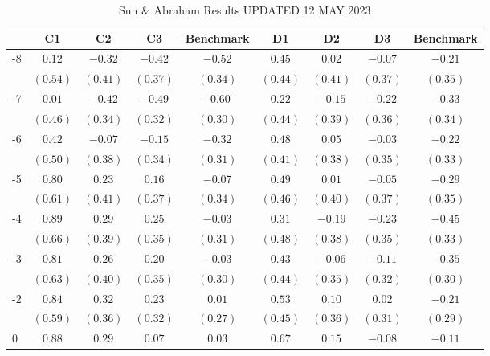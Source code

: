 \documentclass[12pt]{amsart}
\begin{document}
\begin{table}
\begin{center}
\caption{Sun \& Abraham Results UPDATED 12 MAY 2023}
\begin{adjustbox}{width= 0.8\textwidth}
\begin{tabular}{l c c c c | c c c c}
\hline
 & C1 & C2 & C3 & Benchmark & D1 & D2 & D3 & Benchmark \\
\hline
-8 & $0.12$         & $-0.32$  & $-0.42$  & $-0.52$         & $0.45$         & $0.02$   & $-0.07$  & $-0.21$  \\
   & $(0.54)$       & $(0.41)$ & $(0.37)$ & $(0.34)$        & $(0.44)$       & $(0.41)$ & $(0.37)$ & $(0.35)$ \\
-7 & $0.01$         & $-0.42$  & $-0.49$  & $-0.60^{\cdot}$ & $0.22$         & $-0.15$  & $-0.22$  & $-0.33$  \\
   & $(0.46)$       & $(0.34)$ & $(0.32)$ & $(0.30)$        & $(0.44)$       & $(0.39)$ & $(0.36)$ & $(0.34)$ \\
-6 & $0.42$         & $-0.07$  & $-0.15$  & $-0.32$         & $0.48$         & $0.05$   & $-0.03$  & $-0.22$  \\
   & $(0.50)$       & $(0.38)$ & $(0.34)$ & $(0.31)$        & $(0.41)$       & $(0.38)$ & $(0.35)$ & $(0.33)$ \\
-5 & $0.80$         & $0.23$   & $0.16$   & $-0.07$         & $0.49$         & $0.01$   & $-0.05$  & $-0.29$  \\
   & $(0.61)$       & $(0.41)$ & $(0.37)$ & $(0.34)$        & $(0.46)$       & $(0.40)$ & $(0.37)$ & $(0.35)$ \\
-4 & $0.89$         & $0.29$   & $0.25$   & $-0.03$         & $0.31$         & $-0.19$  & $-0.23$  & $-0.45$  \\
   & $(0.66)$       & $(0.39)$ & $(0.35)$ & $(0.31)$        & $(0.48)$       & $(0.38)$ & $(0.35)$ & $(0.33)$ \\
-3 & $0.81$         & $0.26$   & $0.20$   & $-0.03$         & $0.43$         & $-0.06$  & $-0.11$  & $-0.35$  \\
   & $(0.63)$       & $(0.40)$ & $(0.35)$ & $(0.30)$        & $(0.44)$       & $(0.35)$ & $(0.32)$ & $(0.30)$ \\
-2 & $0.84$         & $0.32$   & $0.23$   & $0.01$          & $0.53$         & $0.10$   & $0.02$   & $-0.21$  \\
   & $(0.59)$       & $(0.36)$ & $(0.32)$ & $(0.27)$        & $(0.45)$       & $(0.36)$ & $(0.31)$ & $(0.29)$ \\
0  & $0.88$         & $0.29$   & $0.07$   & $0.03$          & $0.67$         & $0.15$   & $-0.08$  & $-0.11$  \\

\end{tabular}
\end{adjustbox}
\end{center}
\end{table}
\end{document}
